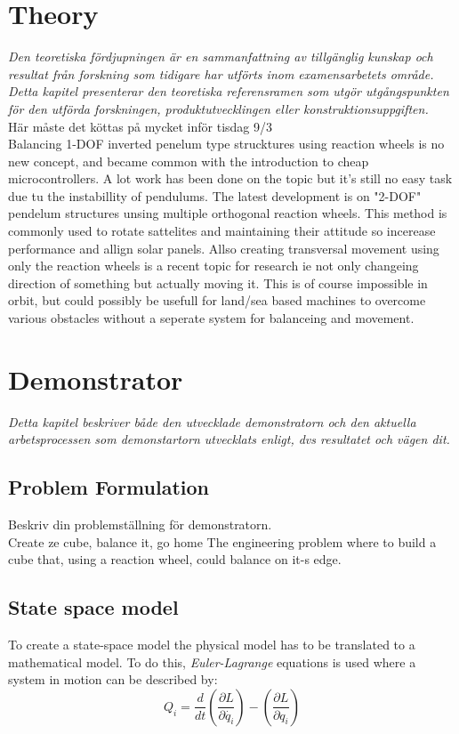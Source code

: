 \documentclass[a4paper,11pt]{kth-mag}
\begin{document}
\chapter{Theory}
\emph{Den teoretiska fördjupningen är en sammanfattning av tillgänglig kunskap och resultat från forskning som tidigare har utförts inom examensarbetets område. Detta kapitel presenterar den teoretiska referensramen som utgör utgångspunkten för den utförda forskningen, produktutvecklingen eller konstruktionsuppgiften.}
\\ Här måste det köttas på mycket inför tisdag 9/3 \\

Balancing 1-DOF inverted penelum type strucktures using reaction wheels is no new concept, and became common with the introduction to cheap microcontrollers. A lot work has been done on the topic but it's still no easy task due tu the instabillity of pendulums. The latest development is on "2-DOF" pendelum structures unsing multiple orthogonal reaction wheels. This method is commonly used to rotate sattelites and maintaining their attitude so incerease performance and allign solar panels. 
Allso creating transversal movement using only the reaction wheels is a recent topic for research ie not only changeing direction of something but actually moving it. This is of course impossible in orbit, but could possibly be usefull for land/sea based machines to overcome various obstacles without a seperate system for balanceing and movement. 
\chapter{Demonstrator}
\emph{Detta kapitel beskriver både den utvecklade demonstratorn och den aktuella arbetsprocessen som demonstartorn utvecklats enligt, dvs resultatet och vägen dit.}


\section{Problem Formulation}
Beskriv din problemställning för demonstratorn.\\
Create ze cube, balance it, go home
The engineering problem where to build a cube that, using a reaction wheel, could balance on it-s edge.
\section{State space model}
To create a state-space model the physical model has to be translated to a mathematical model. To do this, \emph{Euler-Lagrange} equations is used where a system in motion can be described by:
\begin{equation}
Q_i=\frac{d}{dt}\left(\frac{\partial L}{\partial \dot{q_i}}\right)-\left(\frac{\partial L}{\partial q_i}\right)
\end{equation}
\end{document}

